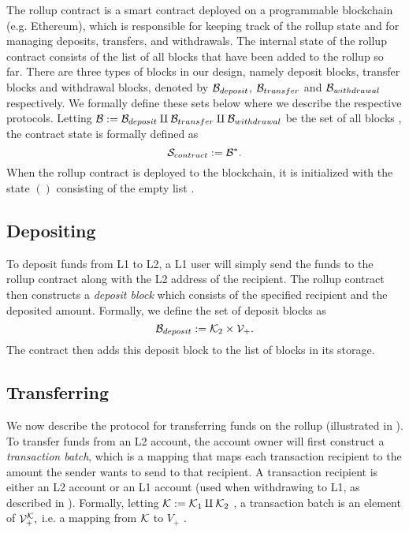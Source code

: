 The rollup contract is a smart contract deployed on a programmable
blockchain (e.g. Ethereum), which is responsible for keeping track of
the rollup state and for managing deposits, transfers, and
withdrawals. The internal state of the rollup contract consists of
the list of all blocks that have been added to the rollup so far.
There are three types of blocks in our design, namely deposit blocks,
transfer blocks and withdrawal blocks, denoted by \(\mathcal{B}_{deposit}\),
\(\mathcal{B}_{transfer}\) and \(\mathcal{B}_{withdrawal}\) respectively. We formally
define these sets below where we describe the respective protocols.
Letting \(\mathcal{B} := \mathcal{B}_{deposit} \amalg \mathcal{B}_{transfer} \amalg
\mathcal{B}_{withdrawal}\) be the set of all blocks
\href{https://github.com/\repo
FVIntmax/Block.lean#L14}{\ExternalLink}, the contract state is
formally defined \href{https://github.com/\repo
FVIntmax/Block.lean#L115}{\ExternalLink} as \[\mathcal{S}_{contract} :=
\mathcal{B}^*.\] When the rollup contract is deployed to the blockchain, it is
initialized with the state \(()\) consisting of the empty list
\href{https://github.com/\repo FVIntmax/Block.lean#L125}{\ExternalLink}.

\subsection{Depositing}\label{section:depositing}

To deposit funds from L1 to L2, a L1 user will simply send the funds
to the rollup contract along with the L2 address of the recipient.
The rollup contract then constructs a \emph{deposit block} which
consists of the specified recipient and the deposited amount.
Formally, we define \href{https://github.com/\repo
FVIntmax/Block.lean#L18}{\ExternalLink} the set of deposit blocks as
\[\mathcal{B}_{deposit} := \mathcal{K}_2 \times \mathcal{V}_+.\] The contract then adds this
deposit block to the list of blocks in its storage.

\subsection{Transferring}\label{section:transferring}

We now describe the protocol for transferring funds on the rollup
(illustrated in ). To transfer funds from an
L2 account, the account owner will first construct a
\emph{transaction batch}, which is a mapping that maps each
transaction recipient to the amount the sender wants to send to that
recipient. A transaction recipient is either an L2 account or an L1
account (used when withdrawing to L1, as described in
). Formally, letting \(\mathcal{K} := \mathcal{K}_1 \amalg
\mathcal{K}_2\) \href{https://github.com/\repo
FVIntmax/Key.lean#L14}{\ExternalLink}, a transaction batch is an
element of \(\mathcal{V}_+^{\mathcal{K}},\) i.e. a mapping from \(\mathcal{K}\) to \(V_+\)
\href{https://github.com/\repo
FVIntmax/TransactionBatch.lean#L22}{\ExternalLink}.

